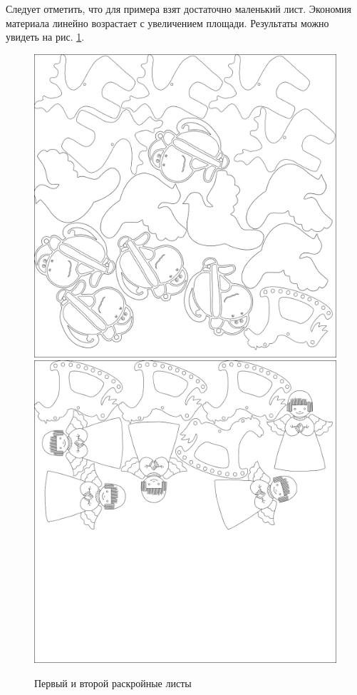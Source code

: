 \documentclass[14pt]{extarticle}
\begin{document}
	Следует отметить, что для примера взят достаточно маленький лист. Экономия материала линейно возрастает с увеличением площади. Результаты можно увидеть на рис. \ref{plane12}.
	\begin{figure}[h]
		\centering
		\includegraphics[scale=0.18]{plane1}
		\includegraphics[scale=0.18]{plane2}
		\caption{Первый и второй раскройные листы}
		\label{plane12}
	\end{figure}
\end{document}
